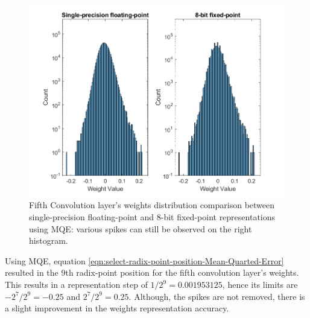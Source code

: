 \begin{figure} [H]
	\centering
	\includegraphics[scale=0.9]{../Images/Weights-distributions/original-vs-fixed8/weight-distribution-conv5-MQE.png}
	\decoRule
	\caption[Fifth Convolution layer's weights distribution comparison between single-precision floating-point and 8-bit fixed-point representations using MQE]{Fifth Convolution layer's weights distribution comparison between single-precision floating-point and 8-bit fixed-point representations using MQE: various spikes can still be observed on the right histogram.}
	\label{fig:weight-distribution-comparison-conv5-MQE}
\end{figure}

Using MQE, equation \ref{eqn:select-radix-point-position-Mean-Quarted-Error} resulted in the 9th radix-point position for the fifth convolution layer's weights. This results in a representation step of $1/2^9 = 0.001953125$, hence its limits are $-2^7/2^9 = -0.25$ and $2^7/2^9 = 0.25$. Although, the spikes are not removed, there is a slight improvement in the weights representation accuracy.


